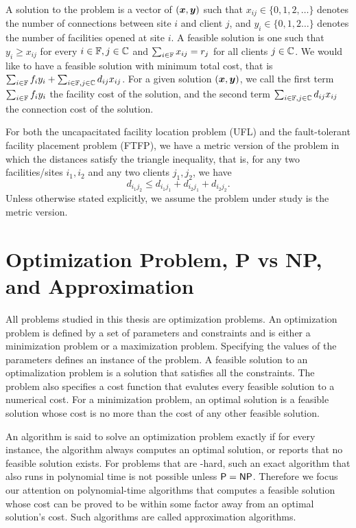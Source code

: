 \documentclass[oneside,final]{ucr}
\begin{document}
A solution to the {\FTFP} problem is a vector of $(\boldsymbol{x},
\boldsymbol{y})$ such that $x_{ij} \in \{0, 1, 2, \ldots\}$ denotes
the number of connections between site $i$ and client $j$,
and $y_i \in \{0, 1, 2\ldots\}$ denotes the number of
facilities opened at site $i$.  A feasible solution is one
such that $y_i \geq x_{ij}$ for every $i \in \mathbb{F}, j
\in \mathbb{C}$ and $\sum_{i\in\mathbb{F}} x_{ij} = r_j$ for
all clients $j \in \mathbb{C}$. We would like to have a
feasible solution with minimum total cost, that is $\sum_{i
  \in \mathbb{F}} f_i y_i + \sum_{i \in \mathbb{F}, j \in
  \mathbb{C}} d_{ij} x_{ij}$. For a given solution
$(\boldsymbol{x},\boldsymbol{y})$, we call the first term $\sum_{i \in
  \mathbb{F}} f_i y_i$ the facility cost of the solution, and
the second term $\sum_{i \in \mathbb{F}, j \in \mathbb{C}}
d_{ij} x_{ij}$ the connection cost of the solution.

For both the uncapacitated facility location problem (UFL)
and the fault-tolerant facility placement problem (FTFP), we
have a metric version of the problem in which the distances
satisfy the triangle inequality, that is, for any two
facilities/sites $i_1,i_2$ and any two clients $j_1,j_2$, we
have
\begin{equation*}
  d_{i_1 j_2} \leq d_{i_1 j_1} + d_{i_2 j_1} + d_{i_2 j_2}.
\end{equation*}
Unless otherwise stated explicitly, we assume the problem
under study is the metric version.

\section{Optimization Problem, P vs NP, and Approximation}
All problems studied in this thesis are optimization
problems. An optimization problem is defined by a set of
parameters and constraints and is either a minimization
problem or a maximization problem. Specifying the values of
the parameters defines an instance of the problem. A
feasible solution to an optimalization problem is a solution
that satisfies all the constraints. The problem also
specifies a cost function that evalutes every feasible
solution to a numerical cost. For a minimization problem, an
optimal solution is a feasible solution whose cost is no
more than the cost of any other feasible solution.

An algorithm is said to solve an optimization problem
exactly if for every instance, the algorithm always computes
an optimal solution, or reports that no feasible solution
exists. For problems that are \NP-hard, such an exact
algorithm that also runs in polynomial time is not possible
unless ${\mbox{\sf P}} = {\mbox{\sf NP}}$. Therefore we focus our attention on
polynomial-time algorithms that computes a feasible solution
whose cost can be proved to be within some factor away from
an optimal solution's cost. Such algorithms are called
approximation algorithms.
\end{document}
